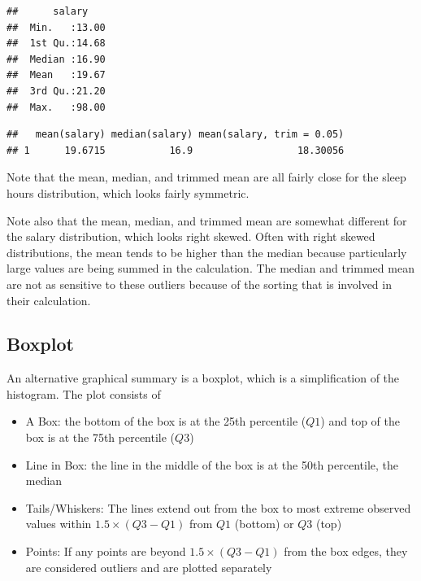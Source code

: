 \documentclass[
]{book}
\newenvironment{Shaded}{\begin{snugshade}}{\end{snugshade}}
\newcommand{\DataTypeTok}[1]{\textcolor[rgb]{0.13,0.29,0.53}{#1}}
\newcommand{\FloatTok}[1]{\textcolor[rgb]{0.00,0.00,0.81}{#1}}
\newcommand{\KeywordTok}[1]{\textcolor[rgb]{0.13,0.29,0.53}{\textbf{#1}}}
\newcommand{\NormalTok}[1]{#1}
\newcommand{\OperatorTok}[1]{\textcolor[rgb]{0.81,0.36,0.00}{\textbf{#1}}}
\newcommand{\StringTok}[1]{\textcolor[rgb]{0.31,0.60,0.02}{#1}}
\providecommand{\tightlist}{%
  \setlength{\itemsep}{0pt}\setlength{\parskip}{0pt}}
\begin{document}
\begin{verbatim}
##      salary     
##  Min.   :13.00  
##  1st Qu.:14.68  
##  Median :16.90  
##  Mean   :19.67  
##  3rd Qu.:21.20  
##  Max.   :98.00
\end{verbatim}

\begin{Shaded}
\end{Shaded}

\begin{verbatim}
##   mean(salary) median(salary) mean(salary, trim = 0.05)
## 1      19.6715           16.9                  18.30056
\end{verbatim}

Note that the mean, median, and trimmed mean are all fairly close for the sleep hours distribution, which looks fairly symmetric.

Note also that the mean, median, and trimmed mean are somewhat different for the salary distribution, which looks right skewed. Often with right skewed distributions, the mean tends to be higher than the median because particularly large values are being summed in the calculation. The median and trimmed mean are not as sensitive to these outliers because of the sorting that is involved in their calculation.

\hypertarget{boxplot}{%
\subsection{Boxplot}\label{boxplot}}

An alternative graphical summary is a boxplot, which is a simplification of the histogram. The plot consists of

\begin{itemize}
\tightlist
\item
  A Box: the bottom of the box is at the 25th percentile (\(Q1\)) and top of the box is at the 75th percentile (\(Q3\))
\item
  Line in Box: the line in the middle of the box is at the 50th percentile, the median
\item
  Tails/Whiskers: The lines extend out from the box to most extreme observed values within \(1.5 \times (Q3-Q1)\) from \(Q1\) (bottom) or \(Q3\) (top)
\item
  Points: If any points are beyond \(1.5 \times (Q3-Q1)\) from the box edges, they are considered outliers and are plotted separately
\end{itemize}
\end{document}
